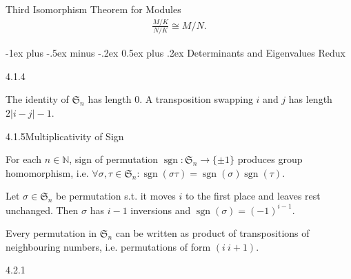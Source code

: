 \documentclass[10pt]{article} %
\makeatletter
\DeclareMathOperator{\sgn}{sgn}
\renewcommand{\section}{\@startsection{section}{1}{0mm}%
                                {-1ex plus -.5ex minus -.2ex}%
                                {0.5ex plus .2ex}%
                                {\normalfont\large\bfseries}}
\makeatother
\begin{document}
\begin{multicols}{3}
\begin{exercise}{60}{Third Isomorphism Theorem for Modules}
        \begin{align*}
            \frac{M/K}{N/K} \cong M/N.
        \end{align*}

\end{exercise}


\section{Determinants and Eigenvalues Redux}

\begin{example}{4.1.4}{}

    The identity of $\mathfrak{S}_n$ has length $0$. A transposition swapping $i$ and $j$ has length $2|i - j| - 1$.

\end{example}

\begin{lemma}{4.1.5}{Multiplicativity of Sign}

    For each $n \in \mathbb{N}$, sign of permutation $\sgn: \mathfrak{S}_n \to \{\pm 1\}$ produces group homomorphism, i.e. $\forall \sigma, \tau \in \mathfrak{S}_n: \sgn(\sigma \tau) = \sgn(\sigma)\sgn(\tau)$.

\end{lemma}

\begin{exercise}{61}{}

    Let $\sigma \in \mathfrak{S}_n$ be permutation s.t. it moves $i$ to the first place and leaves rest unchanged. Then $\sigma$ has $i-1$ inversions and $\sgn(\sigma) = (-1)^{i-1}$.

\end{exercise}

\begin{exercise}{62}{}

    Every permutation in $\mathfrak{S}_n$ can be written as product of transpositions of neighbouring numbers, i.e. permutations of form $(i\ i+1)$.

\end{exercise}

\begin{definition}{4.2.1}{}


\end{definition}
\end{multicols}
\end{document}
